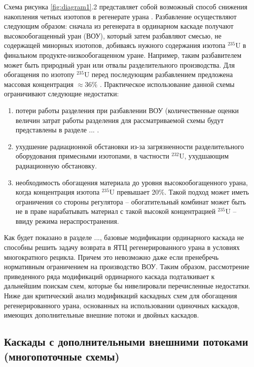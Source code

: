 Схема рисунка \ref{fig:diagram1}.2 представляет собой возможный способ снижения накопления четных изотопов в регенерате урана \cite{SposobIzotopnogoVosstanovleniyaa}. Разбавление осуществляют следующим образом: сначала из регенерата в ординарном каскаде получают высокообогащенный уран (ВОУ), который затем разбавляют смесью, не содержащей минорных изотопов, добиваясь нужного содержания изотопа $^{235}$U в финальном продукте-низкообогащенном уране. Например, таким разбавителем может быть природный уран или отвалы разделительного производства. Для обогащения по изотопу $^{235}$U перед последующим разбавлением предложена массовая концентрация $\approx$36\% \cite{SposobIzotopnogoVosstanovleniyaa}. Практическое использование данной схемы ограничивают следующие недостатки: 
\begin{enumerate}
  \item потери работы разделения при разбавлении ВОУ (количественные оценки величин затрат работы разделения для рассматриваемой схемы будут представлены в разделе ... .
  \item ухудшение радиационной обстановки из-за загрязненности разделительного оборудования примесными изотопами, в частности $^{232}$U, ухудшающим радиационную обстановку.
  \item необходимость обогащения материала до уровня высокообогащенного урана, когда концентрация изотопа $^{235}$U превышает 20\%.
  Такой подход может иметь ограничения со стороны регулятора -- обогатительный комбинат может быть не в праве нарабатывать материал с такой высокой концентрацией $^{235}$U -- ввиду режима нераспространения.
\end{enumerate}

Как будет показано в разделе ..., базовые модификации ординарного каскада не способны решить задачу возврата в ЯТЦ регенерированного урана в условиях многократного рецикла.
Причем это невозможно даже если пренебречь нормативным ограничением на производство ВОУ.
Таким образом, рассмотрение приведенного ряда модификаций ординарного каскада подталкивает к дальнейшим поискам схем, которые бы нивелировали перечисленные недостатки.
Ниже дан критический анализ модификаций каскадных схем для обогащения регенерированного урана, основанных на использовании одиночных каскадов, имеющих дополнительные внешние потоки и двойных каскадов.

\subsection{Каскады с дополнительными внешними потоками (многопоточные схемы)}

